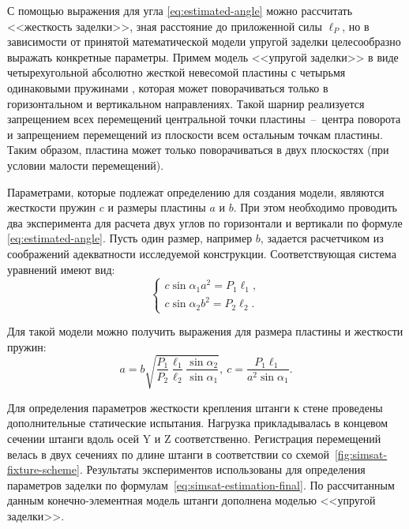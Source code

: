 С помощью выражения для угла \eqref{eq:estimated-angle} можно рассчитать <<жесткость заделки>>, зная расстояние до приложенной силы $ \ell_P $, но в зависимости от принятой математической модели упругой заделки целесообразно выражать конкретные параметры. Примем модель <<упругой заделки>> в виде четырехугольной абсолютно жесткой невесомой пластины с четырьмя одинаковыми пружинами , которая может поворачиваться только в горизонтальном и вертикальном направлениях. Такой шарнир реализуется запрещением всех перемещений центральной точки пластины~--~центра поворота и запрещением перемещений из плоскости всем остальным точкам пластины. Таким образом, пластина может только поворачиваться в двух плоскостях (при условии малости перемещений).

Параметрами, которые подлежат определению для создания модели, являются жесткости пружин $ c $ и размеры пластины $ a $ и $ b $. При этом необходимо проводить два эксперимента для расчета двух углов по горизонтали и вертикали по формуле \eqref{eq:estimated-angle}. Пусть один размер, например $ b $, задается расчетчиком из соображений адекватности исследуемой конструкции. Соответствующая система уравнений имеют вид:
\begin{equation}
	\begin{cases}
		c \sin \alpha_1 a ^ 2 = P_1 \ell_1, \\
		c \sin \alpha_2 b ^ 2 = P_2 \ell_2.
	\end{cases}
\end{equation}

Для такой модели можно получить выражения для размера пластины и жесткости пружин:
\begin{equation}
	a = b \sqrt{\frac{P_1}{P_2} \frac{\ell_1}{\ell_2} \frac{\sin \alpha_2}{\sin \alpha_1}}, \ c = \frac{P_1 \ell_1}{a ^ 2 \sin \alpha_1}. \label{eq:simsat-estimation-final}
\end{equation}

Для определения параметров жесткости крепления штанги к стене проведены дополнительные статические испытания. Нагрузка прикладывалась в концевом сечении штанги вдоль осей $ \mathrm{Y} $ и $ \mathrm{Z} $ соответственно. Регистрация перемещений велась в двух сечениях по длине штанги в соответствии со схемой~\ref{fig:simsat-fixture-scheme}. Результаты экспериментов использованы для определения параметров заделки по формулам~\eqref{eq:simsat-estimation-final}. По рассчитанным данным конечно-элементная модель штанги дополнена моделью <<упругой заделки>>. 

